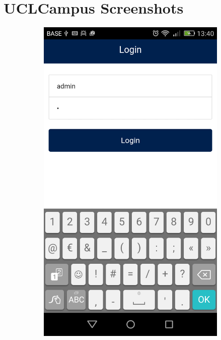 \documentclass{eplmastersthesis}
\begin{document}
\chapter{UCLCampus Screenshots}
\begin{figure}[H]
    \centering
\begin{subfigure}[b]{0.3\textwidth}
        \includegraphics[width=\textwidth]{Images/Application_screens/Screenshot_2016-06-06-13-40-15.png}
    \end{subfigure}

\end{figure}
\end{document}
